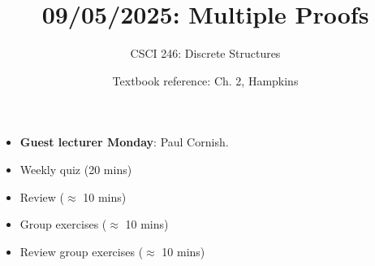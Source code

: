 \documentclass[10pt]{beamer}
\begin{document}






\title{09/05/2025: Multiple Proofs}
\author{CSCI 246: Discrete Structures}
\date{Textbook reference: Ch. 2, Hampkins}

\begin{frame}
    \titlepage 
\end{frame}


\begin{frame}


\begin{mygreenbox}[title=Quiz Set up]
\begin{itemize}
\item \textbf{Guest lecturer Monday}: Paul Cornish.   
\end{itemize}
\end{mygreenbox}

\vfill 

\begin{myyellowbox}[title=Today's Agenda]
\begin{itemize}
	\item Weekly quiz (20 mins)
	\item Review ($\approx$ 10 mins)
	\item Group exercises  ($\approx$ 10 mins)
	\item Review group exercises ($\approx$ 10 mins)
\end{itemize}

\end{myyellowbox}



\end{frame}
\end{document}

